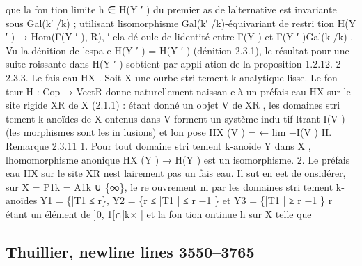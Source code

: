 \documentclass[
  10pt,
]{article}
\newenvironment{Shaded}{}{}
\newcommand{\NormalTok}[1]{#1}
\begin{document}
\begin{Shaded}
\begin{Highlighting}[]
\NormalTok{que la fon tion limite h ∈ H(Y ′ ) du premier as de l\textquotesingle{}alternative est invariante sous Gal(k′ /k) ;}
\NormalTok{utilisant l\textquotesingle{}isomorphisme Gal(k′ /k){-}équivariant de restri tion}
\NormalTok{                                   H(Y ′ ) → Hom(Γ(Y ′ ), R),}
\NormalTok{                                                    ′}
\NormalTok{ ela dé oule de l\textquotesingle{}identité entre Γ(Y ) et Γ(Y ′ )Gal(k /k) .}
\NormalTok{   Vu la dénition de l\textquotesingle{}espa e H(Y ′ ) = H(Y ′ ) (dénition 2.3.1), le résultat pour une suite}
\NormalTok{ roissante dans H(Y ′ ) s\textquotesingle{}obtient par appli ation de la proposition 1.2.12.                 2}
\NormalTok{2.3.3. Le fais eau HX .}
\NormalTok{  Soit X une ourbe stri tement k{-}analytique lisse. Le fon teur H : Cop → VectR donne}
\NormalTok{naturellement naissan e à un préfais eau HX sur le site rigide XR de X (2.1.1) : étant donné}
\NormalTok{un objet V de XR , les domaines stri tement k{-}anoïdes de X ontenus dans V forment un}
\NormalTok{système indu tif ltrant I(V ) (les morphismes sont les in lusions) et l\textquotesingle{}on pose}
\NormalTok{                                      HX (V ) = ←}
\NormalTok{                                                lim}
\NormalTok{                                                  −I(V ) H.}
\NormalTok{Remarque 2.3.11}
\NormalTok{  1. Pour tout domaine stri tement k{-}anoïde Y dans X , l\textquotesingle{}homomorphisme anonique}
\NormalTok{     HX (Y ) → H(Y ) est un isomorphisme.}
\NormalTok{  2. Le préfais eau HX sur le site XR n\textquotesingle{}est lairement pas un fais eau. Il sut en eet de}
\NormalTok{      onsidérer, sur X = P1k = A1k ∪ \{∞\}, le re ouvrement ni par les domaines stri tement}
\NormalTok{     k{-}anoïdes Y1 = \{|T1 ≤ r\}, Y2 = \{r ≤ |T1 | ≤ r −1 \} et Y3 = \{|T1 | ≥ r −1 \}  r étant un}
\NormalTok{     élément de ]0, 1[∩|k× |  et la fon tion ontinue h sur X telle que}
\end{Highlighting}
\end{Shaded}

\subsection{Thuillier, newline lines
3550--3765}\label{thuillier-newline-lines-35503765}
\end{document}

